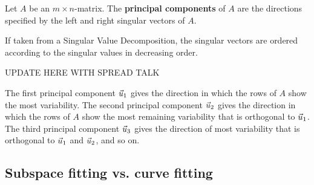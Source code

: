 \documentclass{ximera}
\begin{document}
\begin{definition}\label{def:principal-components}
  Let $A$ be an $m\times n$-matrix. The \textbf{principal components} of $A$ are the directions specified by the left and right singular vectors of $A$.

  If taken from a Singular Value Decomposition, the singular vectors are ordered according to the singular values in decreasing order.
\end{definition}

UPDATE HERE WITH SPREAD TALK

The first principal component $\vec{u}_1$ gives the direction in
which the rows of $A$ show the most variability. The second principal
component $\vec{u}_2$ gives the direction in which the rows of $A$
show the most remaining variability that is orthogonal to
$\vec{u}_1$. The third principal component $\vec{u}_3$ gives the
direction of most variability that is orthogonal to $\vec{u}_1$ and
$\vec{u}_2$, and so on.

\subsection*{Subspace fitting vs. curve fitting}
\end{document}
